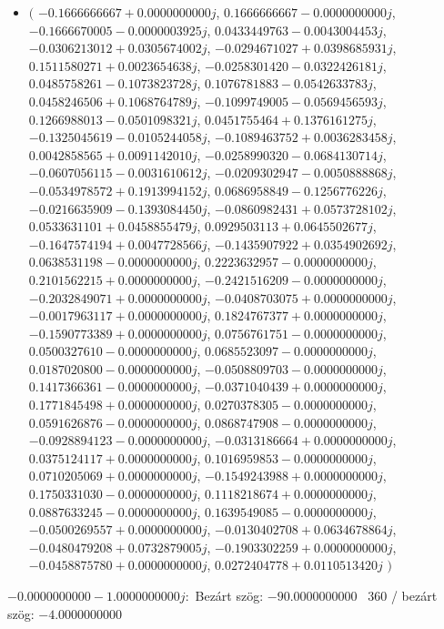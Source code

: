 \documentclass[14pt,a4paper]{article}
\begin{document}
\begin{itemize}
\item
$\big($
$-0.1666666667+0.0000000000j$, $0.1666666667-0.0000000000j$, $-0.1666670005-0.0000003925j$, $0.0433449763-0.0043004453j$, $-0.0306213012+0.0305674002j$, $-0.0294671027+0.0398685931j$, $0.1511580271+0.0023654638j$, $-0.0258301420-0.0322426181j$, $0.0485758261-0.1073823728j$, $0.1076781883-0.0542633783j$, $0.0458246506+0.1068764789j$, $-0.1099749005-0.0569456593j$, $0.1266988013-0.0501098321j$, $0.0451755464+0.1376161275j$, $-0.1325045619-0.0105244058j$, $-0.1089463752+0.0036283458j$, $0.0042858565+0.0091142010j$, $-0.0258990320-0.0684130714j$, $-0.0607056115-0.0031610612j$, $-0.0209302947-0.0050888868j$, $-0.0534978572+0.1913994152j$, $0.0686958849-0.1256776226j$, $-0.0216635909-0.1393084450j$, $-0.0860982431+0.0573728102j$, $0.0533631101+0.0458855479j$, $0.0929503113+0.0645502677j$, $-0.1647574194+0.0047728566j$, $-0.1435907922+0.0354902692j$, $0.0638531198-0.0000000000j$, $0.2223632957-0.0000000000j$, $0.2101562215+0.0000000000j$, $-0.2421516209-0.0000000000j$, $-0.2032849071+0.0000000000j$, $-0.0408703075+0.0000000000j$, $-0.0017963117+0.0000000000j$, $0.1824767377+0.0000000000j$, $-0.1590773389+0.0000000000j$, $0.0756761751-0.0000000000j$, $0.0500327610-0.0000000000j$, $0.0685523097-0.0000000000j$, $0.0187020800-0.0000000000j$, $-0.0508809703-0.0000000000j$, $0.1417366361-0.0000000000j$, $-0.0371040439+0.0000000000j$, $0.1771845498+0.0000000000j$, $0.0270378305-0.0000000000j$, $0.0591626876-0.0000000000j$, $0.0868747908-0.0000000000j$, $-0.0928894123-0.0000000000j$, $-0.0313186664+0.0000000000j$, $0.0375124117+0.0000000000j$, $0.1016959853-0.0000000000j$, $0.0710205069+0.0000000000j$, $-0.1549243988+0.0000000000j$, $0.1750331030-0.0000000000j$, $0.1118218674+0.0000000000j$, $0.0887633245-0.0000000000j$, $0.1639549085-0.0000000000j$, $-0.0500269557+0.0000000000j$, $-0.0130402708+0.0634678864j$, $-0.0480479208+0.0732879005j$, $-0.1903302259+0.0000000000j$, $-0.0458875780+0.0000000000j$, $0.0272404778+0.0110513420j$
$\big)$
\end{itemize}
$-0.0000000000-1.0000000000j$:\
Bezárt szög: $-90.0000000000$ \
360 / bezárt szög: $-4.0000000000$\
\end{document}
